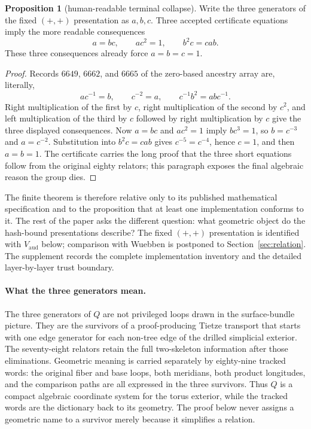 \documentclass[11pt]{article}
\theoremstyle{definition}
\newtheorem{proposition}[theorem]{Proposition}
\begin{document}
\begin{proposition}[human-readable terminal collapse]
\label{prop:terminal-collapse}
Write the three generators of the fixed $(+,+)$ presentation as $a,b,c$.
Three accepted certificate equations imply the more readable consequences
\[
       a=bc,\qquad ac^2=1,\qquad b^2c=cab.
\]
These three consequences already force $a=b=c=1$.
\end{proposition}

\begin{proof}
Records $6649$, $6662$, and $6665$ of the zero-based ancestry array are,
literally,
\[
 ac^{-1}=b,\qquad c^{-2}=a,\qquad c^{-1}b^2=abc^{-1}.
\]
Right multiplication of the first by $c$, right multiplication of the second
by $c^2$, and left multiplication of the third by $c$ followed by right
multiplication by $c$ give the three displayed consequences.  Now $a=bc$ and
$ac^2=1$ imply $bc^3=1$, so $b=c^{-3}$ and $a=c^{-2}$.  Substitution into
$b^2c=cab$ gives $c^{-5}=c^{-4}$, hence $c=1$, and then $a=b=1$.  The certificate carries the
long proof that the three short equations follow from the original eighty
relators; this paragraph exposes the final algebraic reason the group dies.
\end{proof}

The finite theorem is therefore relative only to its published mathematical
specification and to the proposition that at least one implementation
conforms to it.  The rest of the paper asks the different question: what
geometric object do the hash-bound presentations describe?  The fixed
$(+,+)$ presentation is identified with $V_{\mathrm{aud}}$ below; comparison
with Wuebben is postponed to Section~\ref{sec:relation}.  The
supplement records the complete implementation inventory and the detailed
layer-by-layer trust boundary.

\paragraph{What the three generators mean.}
The three generators of $Q$ are not privileged loops drawn in the
surface-bundle picture.  They are the survivors of a proof-producing Tietze
transport that starts with one edge generator for each non-tree edge of the
drilled simplicial exterior.  The seventy-eight relators retain the full
two-skeleton information after those eliminations.  Geometric meaning is
carried separately by eighty-nine tracked words: the original fiber and base
loops, both meridians, both product longitudes, and the comparison paths are
all expressed in the three survivors.  Thus $Q$ is a compact algebraic
coordinate system for the torus exterior, while the tracked words are the
dictionary back to its geometry.  The proof below never assigns a geometric
name to a survivor merely because it simplifies a relation.
\end{document}
